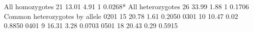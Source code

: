 \documentclass[letterpaper,10pt,english,openany,oneside]{sphinxmanual}
\begin{document}
\begin{sphinxVerbatim}[commandchars=\\\{\}]
   All homozygotes          21       13.01        4.91     1  0.0268*
\PYGZhy{}\PYGZhy{}\PYGZhy{}\PYGZhy{}\PYGZhy{}\PYGZhy{}\PYGZhy{}\PYGZhy{}\PYGZhy{}\PYGZhy{}\PYGZhy{}\PYGZhy{}\PYGZhy{}\PYGZhy{}\PYGZhy{}\PYGZhy{}\PYGZhy{}\PYGZhy{}\PYGZhy{}\PYGZhy{}\PYGZhy{}\PYGZhy{}\PYGZhy{}\PYGZhy{}\PYGZhy{}\PYGZhy{}\PYGZhy{}\PYGZhy{}\PYGZhy{}\PYGZhy{}\PYGZhy{}\PYGZhy{}\PYGZhy{}\PYGZhy{}\PYGZhy{}\PYGZhy{}\PYGZhy{}\PYGZhy{}\PYGZhy{}\PYGZhy{}\PYGZhy{}\PYGZhy{}\PYGZhy{}\PYGZhy{}\PYGZhy{}\PYGZhy{}\PYGZhy{}\PYGZhy{}\PYGZhy{}\PYGZhy{}\PYGZhy{}\PYGZhy{}\PYGZhy{}\PYGZhy{}\PYGZhy{}\PYGZhy{}\PYGZhy{}\PYGZhy{}\PYGZhy{}\PYGZhy{}\PYGZhy{}\PYGZhy{}\PYGZhy{}\PYGZhy{}\PYGZhy{}\PYGZhy{}\PYGZhy{}\PYGZhy{}\PYGZhy{}\PYGZhy{}\PYGZhy{}\PYGZhy{}\PYGZhy{}\PYGZhy{}\PYGZhy{}\PYGZhy{}\PYGZhy{}\PYGZhy{}
 All heterozygotes          26       33.99        1.88     1  0.1706
\PYGZhy{}\PYGZhy{}\PYGZhy{}\PYGZhy{}\PYGZhy{}\PYGZhy{}\PYGZhy{}\PYGZhy{}\PYGZhy{}\PYGZhy{}\PYGZhy{}\PYGZhy{}\PYGZhy{}\PYGZhy{}\PYGZhy{}\PYGZhy{}\PYGZhy{}\PYGZhy{}\PYGZhy{}\PYGZhy{}\PYGZhy{}\PYGZhy{}\PYGZhy{}\PYGZhy{}\PYGZhy{}\PYGZhy{}\PYGZhy{}\PYGZhy{}\PYGZhy{}\PYGZhy{}\PYGZhy{}\PYGZhy{}\PYGZhy{}\PYGZhy{}\PYGZhy{}\PYGZhy{}\PYGZhy{}\PYGZhy{}\PYGZhy{}\PYGZhy{}\PYGZhy{}\PYGZhy{}\PYGZhy{}\PYGZhy{}\PYGZhy{}\PYGZhy{}\PYGZhy{}\PYGZhy{}\PYGZhy{}\PYGZhy{}\PYGZhy{}\PYGZhy{}\PYGZhy{}\PYGZhy{}\PYGZhy{}\PYGZhy{}\PYGZhy{}\PYGZhy{}\PYGZhy{}\PYGZhy{}\PYGZhy{}\PYGZhy{}\PYGZhy{}\PYGZhy{}\PYGZhy{}\PYGZhy{}\PYGZhy{}\PYGZhy{}\PYGZhy{}\PYGZhy{}\PYGZhy{}\PYGZhy{}\PYGZhy{}\PYGZhy{}\PYGZhy{}\PYGZhy{}\PYGZhy{}\PYGZhy{}
Common heterozygotes by allele
              0201          15       20.78        1.61        0.2050
              0301          10       10.47        0.02        0.8850
              0401           9       16.31        3.28        0.0703
              0501          18       20.43        0.29        0.5915


\end{sphinxVerbatim}
\end{document}
